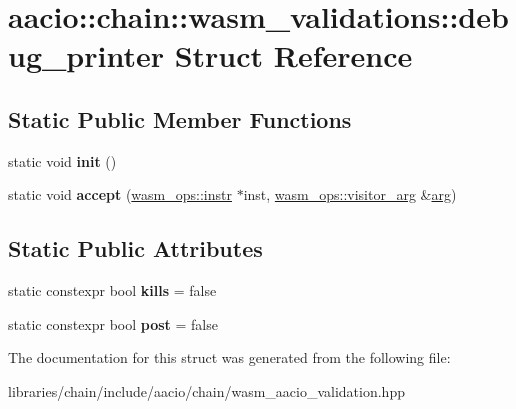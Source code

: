 \hypertarget{structaacio_1_1chain_1_1wasm__validations_1_1debug__printer}{}\section{aacio\+:\+:chain\+:\+:wasm\+\_\+validations\+:\+:debug\+\_\+printer Struct Reference}
\label{structaacio_1_1chain_1_1wasm__validations_1_1debug__printer}
\subsection*{Static Public Member Functions}
\begin{DoxyCompactItemize}
\item 
\mbox{\label{structaacio_1_1chain_1_1wasm__validations_1_1debug__printer_ab583415ddcf21c26e4ec230b726c0192}} 
static void {\bfseries init} ()
\item 
\mbox{\label{structaacio_1_1chain_1_1wasm__validations_1_1debug__printer_a7e8a49cf3b360e2cc48035ef4608b501}} 
static void {\bfseries accept} (\mbox{\hyperlink{structaacio_1_1chain_1_1wasm__ops_1_1instr}{wasm\+\_\+ops\+::instr}} $\ast$inst, \mbox{\hyperlink{structaacio_1_1chain_1_1wasm__ops_1_1visitor__arg}{wasm\+\_\+ops\+::visitor\+\_\+arg}} \&\mbox{\hyperlink{unionarg}{arg}})
\end{DoxyCompactItemize}
\subsection*{Static Public Attributes}
\begin{DoxyCompactItemize}
\item 
\mbox{\label{structaacio_1_1chain_1_1wasm__validations_1_1debug__printer_a11af0b9a0e6e19e9099a7d45ead23970}} 
static constexpr bool {\bfseries kills} = false
\item 
\mbox{\label{structaacio_1_1chain_1_1wasm__validations_1_1debug__printer_a056015bc215cfd4083215f3bf5bbed5b}} 
static constexpr bool {\bfseries post} = false
\end{DoxyCompactItemize}


The documentation for this struct was generated from the following file\+:\begin{DoxyCompactItemize}
\item 
libraries/chain/include/aacio/chain/wasm\+\_\+aacio\+\_\+validation.\+hpp\end{DoxyCompactItemize}
